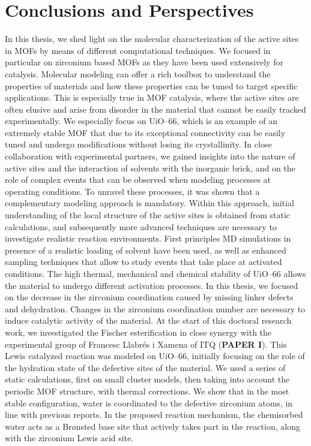 \graphicspath{{figures/chapter4/}}
\renewcommand\evenpagerightmark{{\scshape\small Conclusions and perspectives}} 
\renewcommand\oddpageleftmark{{\scshape\small Chapter 4}}


\hyphenation{}

\chapter[Conclusions and perspectives]%
{Conclusions and Perspectives}
\label{ch4}
In this thesis, we shed light on the molecular characterization of the active sites in MOFs by means of different computational techniques. We focused in particular on zirconium based MOFs as they have been used extensively for catalysis. Molecular modeling can offer a rich toolbox to understand the properties of materials and how these properties can be tuned to target specific applications. This is especially true in MOF catalysis, where the active sites are often elusive and arise from disorder in the material that cannot be easily tracked experimentally. We especially focus on UiO--66, which is an example of an extremely stable MOF that due to its exceptional connectivity can be easily tuned and undergo modifications without losing its crystallinity. In close collaboration with experimental partners, we gained insights into the nature of active sites and the interaction of solvents with the inorganic brick, and on the role of complex events that can be observed when modeling processes at operating conditions. To unravel these processes, it was shown that a complementary modeling approach is mandatory. Within this approach, initial understanding of the local structure of the active sites is obtained from static calculations, and subsequently more advanced techniques are necessary to investigate realistic reaction environments. First principles MD simulations in presence of a realistic loading of solvent have been used, as well as enhanced sampling techniques that allow to study events that take place at activated conditions.
\npar
The high thermal, mechanical and chemical stability of UiO--66 allows the material to undergo different activation processes. In this thesis, we focused on the decrease in the zirconium coordination caused by missing linker defects and dehydration. Changes in the zirconium coordination number are necessary to induce catalytic activity of the material.
\npar
At the start of this doctoral research work, we investigated the Fischer esterification in close synergy with the experimental group of Francesc Llabr\'es i Xamena of ITQ  (\textbf{PAPER I}). This Lewis catalyzed reaction was modeled on UiO--66, initially focusing on the role of the hydration state of the defective sites of the material. We used a series of static calculations, first on small cluster models, then taking into account the periodic MOF structure, with thermal corrections. We show that in the most stable configuration, water is coordinated to the defective zirconium atoms, in line with previous reports. In the proposed reaction mechanism, the chemisorbed water acts as a Br\o{}nsted base site that actively takes part in the reaction, along with the zirconium Lewis acid site. 

